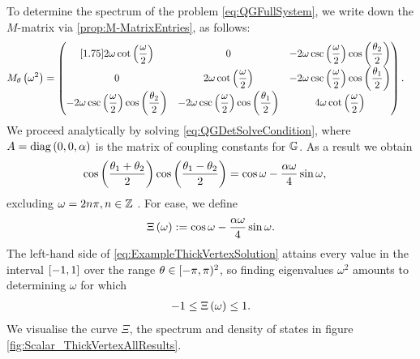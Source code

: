 To determine the spectrum of the problem \eqref{eq:QGFullSystem}, we write down the $M$-matrix via \ref{prop:M-MatrixEntries}, as follows:
\begin{align*}
	M_{\theta}\left( \omega^2 \right) &=
	\begin{pmatrix}[1.75]
		2\omega\cot\left( \dfrac{\omega}{2} \right) & 0 & -2\omega\csc\left( \dfrac{\omega}{2} \right)\cos\left( \dfrac{\theta_2}{2} \right) \\
		0 & 2\omega\cot\left( \dfrac{\omega}{2} \right) & -2\omega\csc\left( \dfrac{\omega}{2} \right)\cos\left( \dfrac{\theta_1}{2} \right) \\
		-2\omega\csc\left( \dfrac{\omega}{2} \right)\cos\left( \dfrac{\theta_2}{2} \right) & -2\omega\csc\left( \dfrac{\omega}{2} \right)\cos\left( \dfrac{\theta_1}{2} \right) & 4\omega\cot\left( \dfrac{\omega}{2} \right)
	\end{pmatrix}.
\end{align*}
We proceed analytically by solving \eqref{eq:QGDetSolveCondition}, where $A=\mathrm{diag}\left( 0,0,\alpha \right)$ is the matrix of coupling constants for $\mathbb{G}$.
As a result we obtain
\begin{align} \label{eq:ExampleThickVertexSolution}
	\cos\left( \frac{\theta_1+\theta_2}{2} \right)\cos\left( \frac{\theta_1-\theta_2}{2} \right) &= \cos\omega - \frac{\alpha\omega}{4}\sin\omega, 
\end{align}
excluding $\omega=2n\pi, n\in\mathbb{Z}$ .
For ease, we define
\begin{align*}
	\Xi\left( \omega \right) := \cos\omega - \frac{\alpha\omega}{4}\sin\omega.
\end{align*}
The left-hand side of \eqref{eq:ExampleThickVertexSolution} attains every value in the interval $\left[ -1,1 \right]$ over the range $\theta\in[-\pi,\pi)^2$, so finding eigenvalues $\omega^2$ amounts to determining $\omega$ for which
\begin{align} \label{eq:ExampleThickVertexDispExpr}
	-1 \leq \Xi\left( \omega \right) \leq 1.
\end{align}
We visualise the curve $\Xi$, the spectrum and density of states in figure \ref{fig:Scalar_ThickVertexAllResults}.
